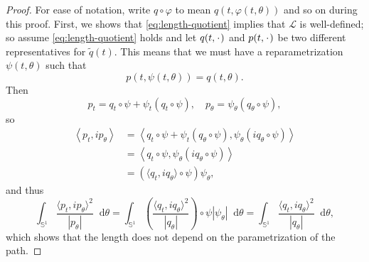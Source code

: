 \documentclass[a4,danish]{article}
\theoremstyle{break}
\theoremstyle{definition}
\theoremstyle{Break}
\renewcommand{\S}{\mathbb{S}}
\newcommand{\blank}{\makebox[1ex]{\textbf{$\cdot$}}}
\renewcommand{\phi}{\varphi}
\newcommand*\diff{\mathop{}\!\mathrm{d}}
\begin{document}
\begin{proof}
  For ease of notation, write $q \circ \phi$ to mean $q(t, \phi(t,\theta))$ and so on during this proof.
  First, we shows that \eqref{eq:length-quotient} implies that $\mathcal{L}$ is well-defined; so assume \eqref{eq:length-quotient} holds and let $q(t,\blank)$ and $p(t, \blank)$ be two different representatives for $\tilde{q}(t)$. This means that we must have a reparametrization $\psi(t,\theta)$ such that
  \begin{equation*}
    p(t, \psi(t,\theta)) = q(t, \theta).
  \end{equation*}
  Then
  \begin{equation*}
    p_t = q_t\circ \psi + \psi_t (q_t \circ \psi), \quad
    p_{\theta} = \psi_{\theta}(q_{\theta} \circ \psi),
  \end{equation*}
  so
  \begin{equation*}
    \begin{aligned}
      \left\langle
        p_t, i p_{\theta}
      \right\rangle
     &  =     \left\langle
        q_t \circ \psi + \psi_t (q_{\theta} \circ \psi),
        \psi_{\theta} (iq_{\theta} \circ \psi)
      \right\rangle \\
     & =     \left\langle
        q_t \circ \psi,
        \psi_{\theta} (iq_{\theta} \circ \psi)
      \right\rangle \\
      & = (\langle q_t, i q_{\theta}\rangle \circ\psi) \psi_{\theta},
    \end{aligned}
  \end{equation*}
  and thus
  \begin{equation*}
    \int_{\S^1} \frac{\langle p_t, i p_{\theta}\rangle^2}{|p_{\theta}|} \diff \theta
    =
    \int_{\S^1} 
    \left(
      \frac{\langle q_t, i q_{\theta}\rangle^2}{|q_{\theta}|}
    \right) \circ \psi |\psi_{\theta}| \diff \theta
    =    \int_{\S^1} 
      \frac{\langle q_t, i q_{\theta}\rangle^2}{|q_{\theta}|}  \diff \theta,
    \end{equation*}
    which shows that the length does not depend on the parametrization of the path.


\end{proof}
\end{document}

